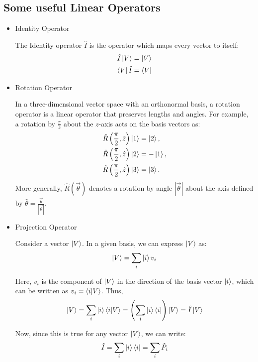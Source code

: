 \documentclass[12pt,a4paper]{report}
\begin{document}
\subsection{Some useful Linear Operators}

\begin{itemize}

\item Identity Operator

The Identity operator $\hat{I}$ is the operator which maps every vector to itself:
\begin{align*}
    \hat{I} \ket{V} = \ket{V} \\
    \bra{V} \hat{I} = \bra{V}
\end{align*}

\item Rotation Operator

In a three-dimensional vector space with an orthonormal basis, a rotation operator is a linear operator that preserves lengths and angles. For example, a rotation by $\frac{\pi}{2}$ about the $z$-axis acts on the basis vectors as:
\begin{align*}
    \hat{R}\left(\frac{\pi}{2}, \hat{z}\right) \ket{1} &= \ket{2}, \\
    \hat{R}\left(\frac{\pi}{2}, \hat{z}\right) \ket{2} &= -\ket{1}, \\
    \hat{R}\left(\frac{\pi}{2}, \hat{z}\right) \ket{3} &= \ket{3}.
\end{align*}
More generally, $\hat{R}(\vec{\theta})$ denotes a rotation by angle $|\vec{\theta}|$ about the axis defined by $\hat{\theta} = \frac{\vec{\theta}}{|\vec{\theta}|}$.

\item Projection Operator

Consider a vector $\ket{V}$. In a given basis, we can express $\ket{V}$ as:
\begin{equation*}
    \ket{V} = \sum_{i} \ket{i}v_i
\end{equation*}

Here, $v_i$ is the component of $\ket{V}$ in the direction of the basis vector $\ket{i}$, which can be written as $v_i = \bra{i}\ket{V}$. Thus,
\begin{equation*}
    \ket{V} = \sum_{i} \ket{i}\bra{i}\ket{V} = \left(\sum_{i} \ket{i}\bra{i} \right)\ket{V} = \hat{I} \ket{V}
\end{equation*}

Now, since this is true for any vector $\ket{V}$, we can write:
\begin{equation*}
    \hat{I} = \sum_{i} \ket{i}\bra{i} = \sum_{i} \hat{P}_i
\end{equation*}


\end{itemize}
\end{document}

